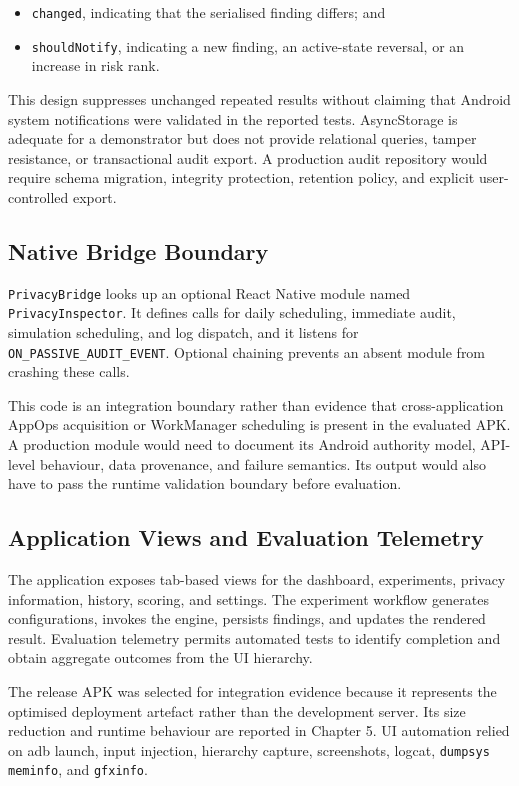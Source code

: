 \begin{itemize}
    \item \texttt{changed}, indicating that the serialised finding differs; and
    \item \texttt{shouldNotify}, indicating a new finding, an active-state reversal, or an increase in risk rank.
\end{itemize}

This design suppresses unchanged repeated results without claiming that Android system notifications were validated in the reported tests. AsyncStorage is adequate for a demonstrator but does not provide relational queries, tamper resistance, or transactional audit export. A production audit repository would require schema migration, integrity protection, retention policy, and explicit user-controlled export.

\subsection{Native Bridge Boundary}

\texttt{PrivacyBridge} looks up an optional React Native module named \texttt{PrivacyInspector}. It defines calls for daily scheduling, immediate audit, simulation scheduling, and log dispatch, and it listens for \texttt{ON\_PASSIVE\_AUDIT\_EVENT}. Optional chaining prevents an absent module from crashing these calls.

This code is an integration boundary rather than evidence that cross-application AppOps acquisition or WorkManager scheduling is present in the evaluated APK. A production module would need to document its Android authority model, API-level behaviour, data provenance, and failure semantics. Its output would also have to pass the runtime validation boundary before evaluation.

\subsection{Application Views and Evaluation Telemetry}

The application exposes tab-based views for the dashboard, experiments, privacy information, history, scoring, and settings. The experiment workflow generates configurations, invokes the engine, persists findings, and updates the rendered result. Evaluation telemetry permits automated tests to identify completion and obtain aggregate outcomes from the UI hierarchy.

The release APK was selected for integration evidence because it represents the optimised deployment artefact rather than the development server. Its size reduction and runtime behaviour are reported in Chapter 5. UI automation relied on adb launch, input injection, hierarchy capture, screenshots, logcat, \texttt{dumpsys meminfo}, and \texttt{gfxinfo}.

